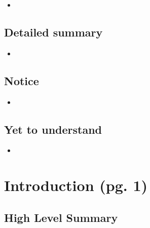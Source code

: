 \documentclass{article}
\begin{document}
    \begin{itemize}

    \item 
    
    \end{itemize}

\subsection{Detailed summary}

    \begin{itemize}

    \item 
    
    \end{itemize}

\subsection{Notice}

    \begin{itemize}

    \item 
    
    \end{itemize}

\subsection{Yet to understand}

    \begin{itemize}

    \item 
    
    \end{itemize}

\section{Introduction (pg. 1)}

\subsection*{High Level Summary}
\end{document}
